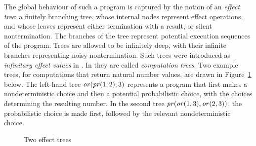 The global behaviour of such a program is captured by the notion of an \emph{effect tree}: a  finitely branching tree, whose 
internal nodes represent effect operations, and whose leaves represent either termination with a result, or silent nontermination. The branches of the tree represent potential execution sequences of the program. 
Trees are allowed to be infinitely deep, with their infinite branches representing noisy nontermination.
Such trees were introduced as \emph{infinitary effect values} in  \cite{plotkin2001adequacy}. In \cite{gom} they are called
\emph{computation trees}. Two example trees, for computations that return natural number values, are drawn in
Figure~\ref{fig:exampletrees} below. The left-hand tree $\operatorname{\mathit{or}} (\operatorname{\mathit{pr}} (1,2), 3)$ represents a program that first makes a nondeterministic choice and then a potential probabilistic choice, with the choices determining the resulting number. In the second tree $\operatorname{\mathit{pr}} (\operatorname{\mathit{or}} (1,3), \operatorname{\mathit{or}} (2,3))$, the probabilistic choice is made first, followed by the relevant nondeterministic choice.

\begin{figure}[h]
\small
    \begin{center}
        \hspace*{8ex}
    \end{center}
    \caption{Two effect trees}
    \label{fig:exampletrees}
\end{figure}






